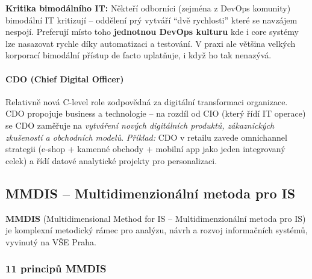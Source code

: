 \textbf{Kritika bimodálního IT:}
Někteří odborníci (zejména z DevOps komunity) bimodální IT kritizují -- oddělení prý vytváří
``dvě rychlosti'' které se navzájem nespojí. Preferují místo toho \textbf{jednotnou DevOps kulturu}
kde i core systémy lze nasazovat rychle díky automatizaci a testování. V praxi ale většina
velkých korporací bimodální přístup de facto uplatňuje, i když ho tak nenazývá.

\paragraph{CDO (Chief Digital Officer)}
Relativně nová C-level role zodpovědná za digitální transformaci organizace.
CDO propojuje business a technologie -- na rozdíl od CIO (který řídí IT operace) se CDO zaměřuje
na \textit{vytváření nových digitálních produktů, zákaznických zkušeností a obchodních modelů}.
\textit{Příklad:} CDO v retailu zavede omnichannel strategii (e-shop + kamenné obchody + mobilní app
jako jeden integrovaný celek) a řídí datové analytické projekty pro personalizaci.

\subsection{MMDIS -- Multidimenzionální metoda pro IS}

\textbf{MMDIS} (Multidimensional Method for IS -- Multidimenzionální metoda pro IS) je komplexní metodický
rámec pro analýzu, návrh a rozvoj informačních systémů, vyvinutý na VŠE Praha.

\subsubsection{11 principů MMDIS}

